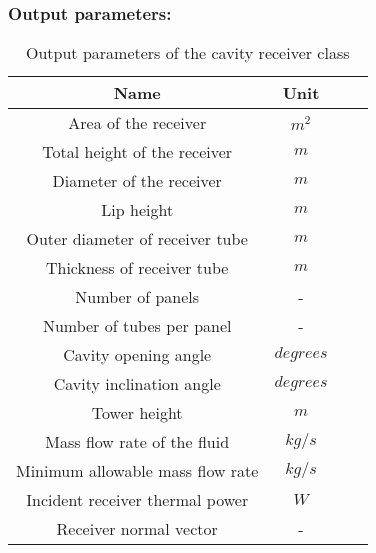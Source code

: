\subsubsection{Output parameters:} 
\begin{table}[h!]
	\begin{center}
		\begin{tabular}{ |c|c|c|c| } 
			\hline
			\textbf{Name} & \textbf{Unit} \\
			\hline
			Area of the receiver & $m^2$ \\
			\hline
			Total height of the receiver & $m$ \\
			\hline
			Diameter of the receiver & $m$ \\
			\hline
			Lip height & $m$ \\
			\hline
			Outer diameter of receiver tube & $m$ \\
			\hline
			Thickness of receiver tube & $m$ \\
			\hline
			Number of panels & - \\
			\hline
			Number of tubes per panel & - \\
			\hline
			Cavity opening angle & $degrees$ \\
			\hline
			Cavity inclination angle & $degrees$ \\
			\hline
			Tower height& $m$ \\
			\hline
			Mass flow rate of the fluid & $kg/s$ \\
			\hline
			Minimum allowable mass flow rate & $kg/s$ \\
			\hline
			Incident receiver thermal power & $W$ \\
			\hline
			Receiver normal vector & - \\
			\hline
		\end{tabular}
		\caption{Output parameters of the cavity receiver class}
		\label{Cavity receiver class output parameters}
	\end{center}
\end{table}
